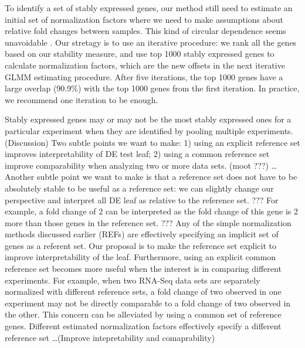 \documentclass[letterpaper,12pt]{article}
\begin{document}
To identify a set of stably expressed genes, our method still need to estimate an initial set of normalization factors where we need to make assumptions about relative fold changes between samples. This kind of circular dependence seems unavoidable \citep{vandesompele2002accurate}. Our stretagy is to use an iterative procedure: we rank all the genes based on our stability measure, and use top 1000 stably expressed genes to calculate normalization factors, which are the new offsets in the next iterative GLMM estimating procedure. After five iterations, the top 1000 genes have a large overlap (90.9\%) with the top 1000 genes from the first iteration. In practice, we recommend one iteration to be enough.  


Stably expressed genes may or may not be the most stably expressed ones for a
particular experiment when they are identified by pooling multiple
experiments. (Discussion) Two subtle points we want to make: 1) using an explicit reference set improves interpretability of DE test leaf; 2) using a common reference
set improve comparability when analyzing two or more data sets. (moot ???)
\dots Another subtle point we want to make is that a reference set does not
have to be absolutely stable to be useful as a reference set: we can slightly
change our perspective and interpret all DE leaf as relative to the
reference set.  ??? For example, a fold change of 2 can be interpreted as the
fold change of this gene is 2 more than those genes in the reference set. ???
Any of the simple normalization methods discussed earlier (REFs) are
effectively specifying an implicit set of genes as a referent set. Our
proposal is to make the reference set explicit to improve interpretability of
the leaf.  Furthermore, using an explicit common reference set becomes more
useful when the interest is in comparing different experiments. For example,
when two RNA-Seq data sets are separately normalized with different reference
sets, a fold change of two observed in one experiment may not be directly
comparable to a fold change of two observed in the other.  This concern can be
alleviated by using a common set of reference genes.
Different estimated normalization factors effectively specify a different
reference set \ldots (Improve intepretability and comaprability)





\end{document}
